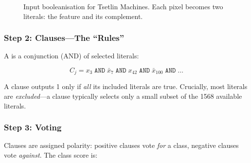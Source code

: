 \begin{figure}[htbp]
\centering
{}
\caption{Input booleanisation for Tsetlin Machines. Each pixel becomes
  two literals: the feature and its complement.}
\label{fig:tm-booleanise}
\end{figure}

\subsubsection{Step 2: Clauses---The ``Rules''}

A  is a conjunction (AND) of selected literals:

\begin{equation}
  C_j = x_3 \;\texttt{AND}\; \bar{x}_7 \;\texttt{AND}\; x_{42}
    \;\texttt{AND}\; \bar{x}_{100} \;\texttt{AND}\; \ldots
  \label{eq:clause}
\end{equation}

A clause outputs 1 only if \emph{all} its included literals are true.
Crucially, most literals are \emph{excluded}---a clause typically
selects only a small subset of the 1568 available literals.

\subsubsection{Step 3: Voting}

Clauses are assigned polarity: positive clauses vote \emph{for} a
class, negative clauses vote \emph{against}. The class score is:

